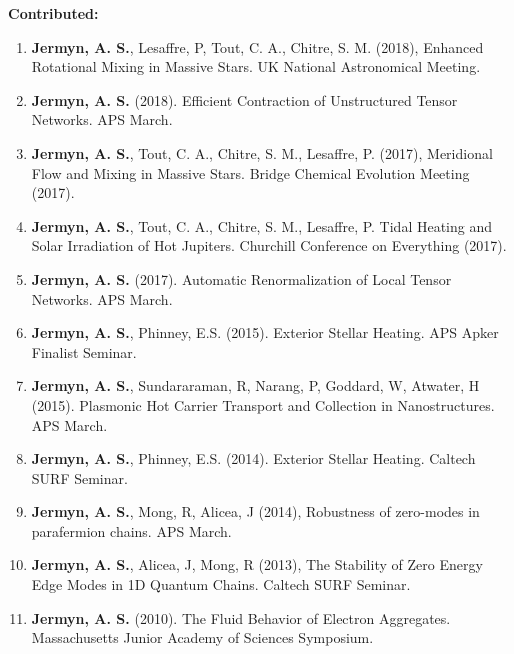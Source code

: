 \documentclass[line, margin]{res3address}
\begin{document}
\begin{resume}
\begin{enumerate}[leftmargin=10pt]
\end{enumerate}
\textbf{Contributed:}
\begin{enumerate}[leftmargin=10pt]
\item \textbf{Jermyn, A. S.}, Lesaffre, P, Tout, C. A., Chitre, S. M.  (2018), Enhanced Rotational Mixing in Massive Stars. UK National Astronomical Meeting.
\item \textbf{Jermyn, A. S.} (2018). Efficient Contraction of Unstructured Tensor Networks. APS March.
\item \textbf{Jermyn, A. S.}, Tout, C. A., Chitre, S. M., Lesaffre, P. (2017), Meridional Flow and Mixing in Massive Stars. Bridge Chemical Evolution Meeting (2017).
\item \textbf{Jermyn, A. S.}, Tout, C. A., Chitre, S. M., Lesaffre, P. Tidal Heating and Solar Irradiation of Hot Jupiters. Churchill Conference on Everything (2017).
\item \textbf{Jermyn, A. S.} (2017). Automatic Renormalization of Local Tensor Networks. APS March.
\item \textbf{Jermyn, A. S.}, Phinney, E.S. (2015). Exterior Stellar Heating. APS Apker Finalist Seminar.
\item \textbf{Jermyn, A. S.}, Sundararaman, R, Narang, P, Goddard, W, Atwater, H (2015). Plasmonic Hot Carrier Transport and Collection in Nanostructures. APS March.
\item \textbf{Jermyn, A. S.}, Phinney, E.S. (2014). Exterior Stellar Heating. Caltech SURF Seminar.
\item \textbf{Jermyn, A. S.}, Mong, R, Alicea, J (2014), Robustness of zero-modes in parafermion chains. APS March.
\item \textbf{Jermyn, A. S.}, Alicea, J, Mong, R (2013), The Stability of Zero Energy Edge Modes in 1D Quantum Chains. Caltech SURF Seminar.
\item \textbf{Jermyn, A. S.} (2010). The Fluid Behavior of Electron Aggregates. Massachusetts Junior Academy of Sciences Symposium.
\end{enumerate}


\end{resume}
\end{document}
